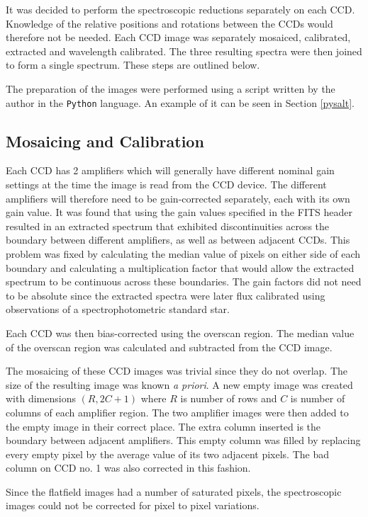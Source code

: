 It was decided to perform the spectroscopic reductions separately on each CCD. Knowledge of the relative positions and rotations between the CCDs would therefore not be needed. Each CCD image was separately mosaiced, calibrated, extracted and wavelength calibrated. The three resulting spectra were then joined to form a single spectrum. These steps are outlined below.

The preparation of the images were performed using a script written by the author in the \texttt{Python} language. An example of it can be seen in Section \ref{pysalt}. 

\subsection{Mosaicing and Calibration}
\label{calibrate}

Each CCD has 2 amplifiers which will generally have different nominal gain settings at the time the image is read from the CCD device. The different amplifiers will therefore need to be gain-corrected separately, each with its own gain value. It was found that using the gain values specified in the FITS header resulted in an extracted spectrum that exhibited discontinuities across the boundary between different amplifiers, as well as between adjacent CCDs. This problem was fixed by calculating the median value of pixels on either side of each boundary and calculating a multiplication factor that would allow the extracted spectrum to be continuous across these boundaries. The gain factors did not need to be absolute since the extracted spectra were later flux calibrated using observations of a spectrophotometric standard star.

Each CCD was then bias-corrected using the overscan region. The median value of the overscan region was calculated and subtracted from the CCD image.

The mosaicing of these CCD images was trivial since they do not overlap. The size of the resulting image was known \textit{a priori}. A new empty image was created with dimensions $(R,2C+1)$ where $R$ is number of rows and $C$ is number of columns of each amplifier region. The two amplifier images were then added to the empty image in their correct place. The extra column inserted is the boundary between adjacent amplifiers. This empty column was filled by replacing every empty pixel by the average value of its two adjacent pixels. The bad column on CCD no. 1 was also corrected in this fashion.

Since the flatfield images had a number of saturated pixels, the spectroscopic images could not be corrected for pixel to pixel variations.

